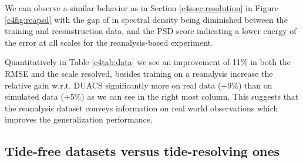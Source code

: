 \begin{bibunit}
We can observe a similar behavior as in Section \ref{c4ssec:resolution} in Figure \ref{c4fig:reapsd} with the gap of in spectral density being diminished between the training and reconstruction data, and the PSD score indicating a lower energy of the error at all scales for the reanalysis-based experiment.

Quantitatively in Table \ref{c4tab:data} we see an improvement of 11\% in both the RMSE and the scale resolved, besides training on a reanalysis increase the relative gain w.r.t. DUACS significantly more on real data (+9\%) than on simulated data (+5\%) as we can see in the right most column. This suggests that the reanalysis dataset conveys information on real world observations which improves the generalization performance.

\subsection*{Tide-free datasets versus tide-resolving ones}
\label{c4ssec:tide}







\end{bibunit}
